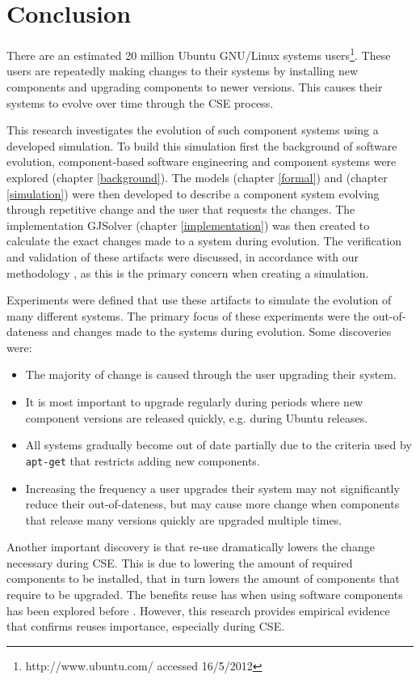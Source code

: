 \chapter{Conclusion}
\label{conclusion}
There are an estimated 20 million Ubuntu GNU/Linux systems users\footnote{http://www.ubuntu.com/ accessed 16/5/2012}.
These users are repeatedly making changes to their systems by installing new components and upgrading components to newer versions.
This causes their systems to evolve over time through the CSE process.

This research investigates the evolution of such component systems using a developed simulation.
To build this simulation first the background of software evolution, component-based software engineering and component systems were explored (chapter \ref{background}).
The models \modelname (chapter \ref{formal}) and \usermodel (chapter \ref{simulation}) were then developed 
to describe a component system evolving through repetitive change and the user that requests the changes.
The implementation GJSolver (chapter \ref{implementation}) was then created to calculate the exact changes made to a system during evolution.
The verification and validation of these artifacts were discussed, in accordance with our methodology \cite{Law2005}, 
as this is the primary concern when creating a simulation.

Experiments were defined that use these artifacts to simulate the evolution of many different systems.
The primary focus of these experiments were the out-of-dateness and changes made to the systems during evolution.
Some discoveries were:
\begin{itemize}
  \item The majority of change is caused through the user upgrading their system.
  \item It is most important to upgrade regularly during periods where new component versions are released quickly, e.g. during Ubuntu releases.
  \item All systems gradually become out of date partially due to the criteria used by \texttt{apt-get} that restricts adding new components.
  \item Increasing the frequency a user upgrades their system may not significantly reduce their out-of-dateness, 
  but may cause more change when components that release many versions quickly are upgraded multiple times.
\end{itemize} 

Another important discovery is that re-use dramatically lowers the change necessary during CSE.
This is due to lowering the amount of required components to be installed,
that in turn lowers the amount of components that require to be upgraded.
The benefits reuse has when using software components has been explored before \citep{Szyperski2002}.
However, this research provides empirical evidence that confirms reuses importance, especially during CSE.

